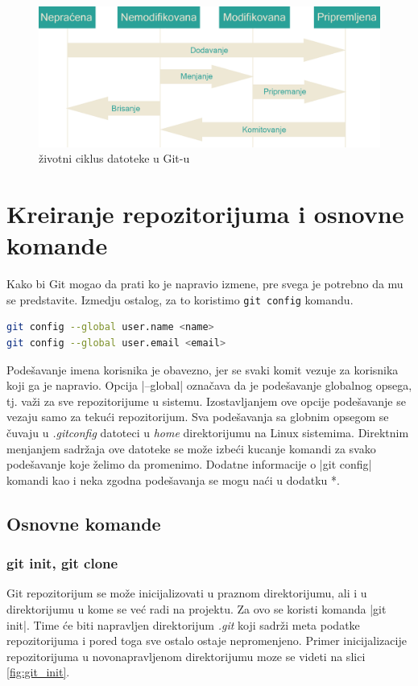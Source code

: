 \documentclass[a4paper]{article}
\begin{document}
{\begin{figure}[h!]
\begin{center}
\includegraphics[scale=0.19]{images/lifecycle2.png}
\end{center}
\caption{životni ciklus datoteke u Git-u}
\label{fig:git_lifecycle}
\end{figure}


\section{Kreiranje repozitorijuma i osnovne komande}
\label{sec:kreiranje}

Kako bi Git mogao da prati ko je napravio izmene, pre svega je potrebno da mu se predstavite. Izmedju ostalog, za to koristimo  \texttt{git config} komandu.

\begin{lstlisting}[language=bash]
git config --global user.name <name>
git config --global user.email <email>
\end{lstlisting}

\noindent
Podešavanje imena korisnika je obavezno, jer se svaki komit vezuje za korisnika koji ga je napravio. Opcija |--global| označava da je podešavanje globalnog opsega, tj. važi za sve repozitorijume u sistemu. Izostavljanjem ove opcije podešavanje se vezaju samo za tekući repozitorijum. Sva podešavanja sa globnim opsegom se čuvaju u \textit{.gitconfig} datoteci u \textit{home} direktorijumu na Linux sistemima. Direktnim menjanjem sadržaja ove datoteke se može izbeći kucanje komandi za svako podešavanje koje želimo da promenimo. Dodatne informacije o |git config| komandi kao i neka zgodna podešavanja se mogu naći u dodatku *.

\subsection{Osnovne komande}
\label{osnovne_komande}

\subsubsection*{git init, git clone}
\label{subsec:git_init}
Git repozitorijum se može inicijalizovati u praznom direktorijumu, ali i u direktorijumu u kome se već radi na projektu. Za ovo se koristi komanda |git init|. Time će biti napravljen direktorijum \textit{.git} koji sadrži meta podatke repozitorijuma i pored toga sve ostalo ostaje nepromenjeno. Primer inicijalizacije repozitorijuma u novonapravljenom direktorijumu moze se videti na slici \ref{fig:git_init}.

}
\end{document}
